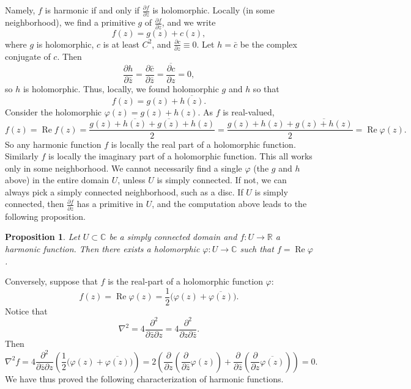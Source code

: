 \documentclass[12pt,openany]{book}
\renewcommand{\Re}{\operatorname{Re}}
\newcommand{\C}{{\mathbb{C}}}
\newcommand{\R}{{\mathbb{R}}}
\theoremstyle{plain}
\newtheorem{prop}[thm]{Proposition}
\theoremstyle{remark}
\theoremstyle{definition}
\theoremstyle{exercise}
\theoremstyle{example}
\begin{document}
Namely, $f$ is harmonic if and only if
$\frac{\partial f}{\partial z}$ is holomorphic.
Locally (in some neighborhood), we find a
primitive $g$ of $\frac{\partial f}{\partial z}$, and we write
\begin{equation*}
f(z) = g(z) + c(z) ,
\end{equation*}
where $g$ is holomorphic, $c$ is at least $C^2$, and $\frac{\partial c}{\partial z} \equiv 0$.
Let $h = \bar{c}$ be the complex conjugate of $c$.  Then 
\begin{equation*}
\frac{\partial h}{\partial \bar{z}}
=
\frac{\partial \bar{c}}{\partial \bar{z}}
=
\overline{
\frac{\partial c}{\partial z}
}
=
0 ,
\end{equation*}
so $h$ is holomorphic.  Thus, locally, we found holomorphic $g$ and $h$ so
that
\begin{equation*}
f(z) = g(z) + \overline{h(z)} .
\end{equation*}
Consider the holomorphic $\varphi(z) = g(z) + h(z)$.
As $f$ is real-valued,
\begin{equation*}
f(z) = \Re f(z) =
\frac{g(z) + \overline{h(z)} + \overline{g(z)}+h(z)}{2}
=
\frac{g(z) + h(z) + \overline{g(z)+h(z)}}{2}
=
\Re \varphi(z) .
\end{equation*}
So any harmonic function $f$ is locally the real part of a holomorphic
function.  Similarly $f$ is locally the imaginary part of a holomorphic
function.
This all works only in some neighborhood.  We cannot necessarily find a single
$\varphi$ (the $g$ and $h$ above) in the entire
domain $U$, unless $U$ is simply connected.  If not, we can always
pick a simply connected neighborhood, such as a disc.
If $U$ is simply connected, then
$\frac{\partial f}{\partial z}$ has a primitive in $U$,
and the computation above leads to
the following proposition.

\begin{prop} \label{prop:harmconj}
Let $U \subset \C$ be a simply connected domain and $f \colon U \to \R$ a
harmonic function.  Then there exists a holomorphic $\varphi \colon
U \to \C$ such that $f = \Re \varphi$.
\end{prop}

Conversely,
suppose that $f$ is the real-part of a holomorphic function $\varphi$:
\begin{equation*}
f(z) = \Re \varphi(z) =
\frac{1}{2}\bigl( \varphi(z) + \overline{\varphi(z)} \bigr) .
\end{equation*}
Notice that
\begin{equation*}
\nabla^2 =
4 \frac{\partial^2}{\partial \bar{z} \partial z}
=
4 \frac{\partial^2}{\partial z \partial \bar{z}} .
\end{equation*}
Then
\begin{equation*}
\nabla^2 f =
4 \frac{\partial^2}{\partial \bar{z} \partial z}
\left(
\frac{1}{2}\bigl( \varphi(z) + \overline{\varphi(z)} \bigr)
\right)
=
2
\left(
\frac{\partial}{\partial z}
\left(
\frac{\partial}{\partial \bar{z}}
\varphi(z)
\right)+
\frac{\partial}{\partial \bar{z}}
\left(
\frac{\partial}{\partial z}
\overline{\varphi(z)}
\right)
\right)
=
0 .
\end{equation*}
We have thus proved the following characterization of harmonic
functions.
\end{document}
